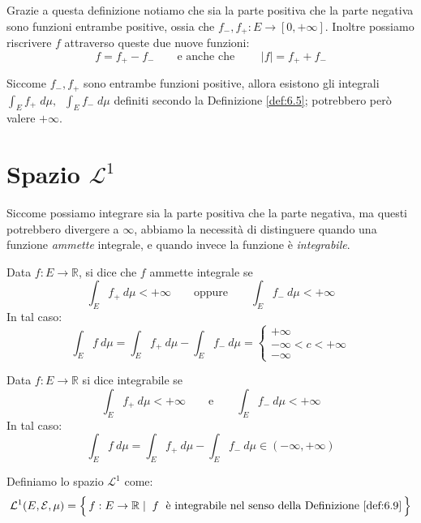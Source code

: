 Grazie a questa definizione notiamo che sia la parte positiva che la parte negativa sono funzioni entrambe positive, ossia che $f_-, f_+:E\to[0, +\infty]$. Inoltre possiamo riscrivere $f$ attraverso queste due nuove funzioni:
\[f = f_+-f_-\qquad \text{e anche che } \qquad |f| = f_++f_-\]

Siccome $f_-, f_+$ sono entrambe funzioni positive, allora esistono gli integrali $\int_Ef_+\;d\mu, \;\;\int_Ef_-\;d\mu$ definiti secondo la Definizione \ref{def:6.5}; potrebbero però valere $+\infty$.

\section{Spazio $\mathcal{L}^1$}
Siccome possiamo integrare sia la parte positiva che la parte negativa, ma questi potrebbero divergere a $\infty$, abbiamo la necessità di distinguere quando una funzione \textit{ammette} integrale, e quando invece la funzione è \textit{integrabile}.

\begin{definizione}
    Data $f:E\to\mathbb{R}$, si dice che $f$ ammette integrale se 
    \[\int_Ef_+\:d\mu<+\infty\qquad \text{oppure}\qquad \int_Ef_-\:d\mu<+\infty\]
    In tal caso: 
    \[\int_Ef\:d\mu = \int_Ef_+\:d\mu-\int_Ef_-\:d\mu = 
    \begin{cases}
        +\infty\\
        -\infty<c<+\infty\\
        -\infty
    \end{cases}\]
\end{definizione}

\begin{definizione}
\label{def:6.9}
    Data $f:E\to\mathbb{R}$ si dice integrabile se
    \[\int_Ef_+\:d\mu<+\infty\qquad \text{e}\qquad \int_Ef_-\:d\mu<+\infty\]
    In tal caso: 
    \[\boxed{\int_Ef\:d\mu = \int_Ef_+\:d\mu-\int_Ef_-\:d\mu} \in (-\infty, +\infty) \]
\end{definizione}

\begin{definizione}
    Definiamo lo spazio $\mathcal{L}^1$ come: 
    \[\mathcal{L}^1(E, \mathcal{E, \mu}) = \Bigl\{\,f:E\to\mathbb{R}\mid \;f\;\text{ è integrabile nel senso della Definizione \ref{def:6.9}}\,\Bigr\}\]
\end{definizione}

